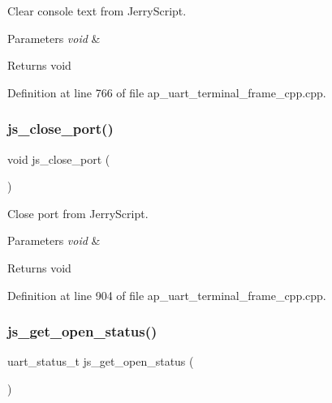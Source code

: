 Clear console text from Jerry\+Script. 


\begin{DoxyParams}{Parameters}
{\em void} & \\
\hline
\end{DoxyParams}
\begin{DoxyReturn}{Returns}
void 
\end{DoxyReturn}


Definition at line 766 of file ap\+\_\+uart\+\_\+terminal\+\_\+frame\+\_\+cpp.\+cpp.

\mbox{\label{group___u_a_r_t__terminal_ga34f4e46cbbd8ec24f730805302d9f057}} 
\subsubsection{js\_close\_port()}
{\footnotesize\ttfamily void js\+\_\+close\+\_\+port (\begin{DoxyParamCaption}\item[{void}]{ }\end{DoxyParamCaption})}



Close port from Jerry\+Script. 


\begin{DoxyParams}{Parameters}
{\em void} & \\
\hline
\end{DoxyParams}
\begin{DoxyReturn}{Returns}
void 
\end{DoxyReturn}


Definition at line 904 of file ap\+\_\+uart\+\_\+terminal\+\_\+frame\+\_\+cpp.\+cpp.

\mbox{\label{group___u_a_r_t__terminal_ga2424f6e22851938a5dfb5a9cc88c5d9b}} 
\subsubsection{js\_get\_open\_status()}
{\footnotesize\ttfamily uart\+\_\+status\+\_\+t js\+\_\+get\+\_\+open\+\_\+status (\begin{DoxyParamCaption}\item[{void}]{ }\end{DoxyParamCaption})}



